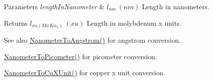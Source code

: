 \begin{DoxyParams}{Parameters}
{\em length\+In\+Nanometer} & $ l_{nm}\ (nm)$ Length in nanometers. \\
\hline
\end{DoxyParams}
\begin{DoxyReturn}{Returns}
$ l_{xu(Mo\ K\alpha_1)}\ (xu)$ Length in molybdenum x units. 
\end{DoxyReturn}
\begin{DoxySeeAlso}{See also}
\mbox{\hyperlink{group___e_g_x_math-_conversions-_length_conversions-_nanometer-_non-_s_i_ga7e2062d4cc1a422e54da597c4413efb1}{Nanometer\+To\+Angstrom()}} for angstrom conversion. 

\mbox{\hyperlink{group___e_g_x_math-_conversions-_length_conversions-_nanometer-_s_i_gaba1e9bf91f6e065f8ba8be8dd039b499}{Nanometer\+To\+Picometer()}} for picometer conversion. 

\mbox{\hyperlink{group___e_g_x_math-_conversions-_length_conversions-_nanometer-_non-_s_i_ga59399657caa5a9c81df2ffbe1ff7683c}{Nanometer\+To\+Cu\+X\+Unit()}} for copper x unit conversion. 
\end{DoxySeeAlso}
